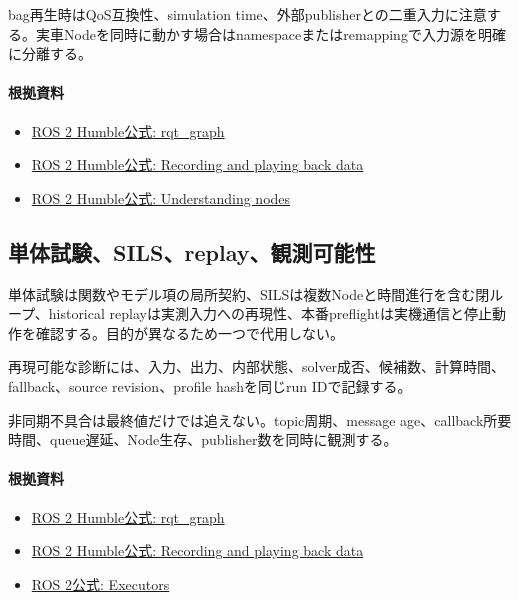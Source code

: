 \documentclass[a4paper,11pt]{article}
\begin{document}
bag再生時はQoS互換性、simulation time、外部publisherとの二重入力に注意する。実車Nodeを同時に動かす場合はnamespaceまたはremappingで入力源を明確に分離する。

\paragraph{根拠資料}
\begin{itemize}[leftmargin=1.6em]
\item \href{https://docs.ros.org/en/ros2_packages/humble/api/rqt_graph/index.html}{ROS 2 Humble公式: rqt\_graph}
\item \href{https://docs.ros.org/en/humble/Tutorials/Beginner-CLI-Tools/Recording-And-Playing-Back-Data/Recording-And-Playing-Back-Data.html}{ROS 2 Humble公式: Recording and playing back data}
\item \href{https://docs.ros.org/en/humble/Tutorials/Beginner-CLI-Tools/Understanding-ROS2-Nodes/Understanding-ROS2-Nodes.html}{ROS 2 Humble公式: Understanding nodes}
\end{itemize}

\subsection{単体試験、SILS、replay、観測可能性}
単体試験は関数やモデル項の局所契約、SILSは複数Nodeと時間進行を含む閉ループ、historical replayは実測入力への再現性、本番preflightは実機通信と停止動作を確認する。目的が異なるため一つで代用しない。


再現可能な診断には、入力、出力、内部状態、solver成否、候補数、計算時間、fallback、source revision、profile hashを同じrun IDで記録する。


非同期不具合は最終値だけでは追えない。topic周期、message age、callback所要時間、queue遅延、Node生存、publisher数を同時に観測する。

\paragraph{根拠資料}
\begin{itemize}[leftmargin=1.6em]
\item \href{https://docs.ros.org/en/ros2_packages/humble/api/rqt_graph/index.html}{ROS 2 Humble公式: rqt\_graph}
\item \href{https://docs.ros.org/en/humble/Tutorials/Beginner-CLI-Tools/Recording-And-Playing-Back-Data/Recording-And-Playing-Back-Data.html}{ROS 2 Humble公式: Recording and playing back data}
\item \href{https://docs.ros.org/en/rolling/Concepts/Intermediate/About-Executors.html}{ROS 2公式: Executors}
\end{itemize}
\end{document}
